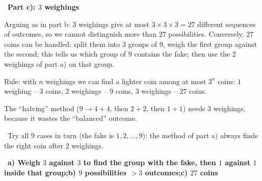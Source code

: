 \documentclass[11pt]{article}
\providecommand{\AnsWord}{Đáp số}
\newcommand{\ans}[1]{\par\smallskip{\bfseries\color{tmGreen!88!black}\AnsWord:}\ {\bfseries\color{AnsRed}#1}\par}
\newcommand{\step}[2]{\par\smallskip\noindent{\bfseries\color{tmBlue!85!black}\StepWord~#1.}\ {\bfseries #2}\par\nopagebreak}
\newcommand{\verify}[1]{\par\smallskip\noindent{\bfseries\color{tmGreen!80!black}\faCheckCircle\ \CheckWord}\ #1\par}
\def\AnsWord{Answer}
\def\StepWord{Step}
\def\CheckWord{Check:}
\begin{document}
{\step{4}{Part c): $3$ weighings}
Arguing as in part b: $3$ weighings give at most $3\times 3\times 3 = 27$ different sequences of outcomes, so we cannot distinguish more
than $27$ possibilities. Conversely, $27$ coins can be handled: split them into $3$ groups of $9$, weigh the first group against the
second; this tells us which group of $9$ contains the fake; then use the $2$ weighings of part a) on that group.
\begin{tipbox}Rule: with $n$ weighings we can find a lighter coin among at most $3^n$ coins: $1$ weighing -- $3$ coins, $2$ weighings --
$9$ coins, $3$ weighings -- $27$ coins.\end{tipbox}
\begin{warnbox}The ``halving'' method ($9 \to 4 + 4$, then $2 + 2$, then $1 + 1$) needs $3$ weighings, because it wastes the
``balanced'' outcome.\end{warnbox}
\verify{Try all $9$ cases in turn (the fake is $1, 2, \dots, 9$): the method of part a) always finds the right coin after $2$ weighings.}
\ans{a) Weigh $3$ against $3$ to find the group with the fake, then $1$ against $1$ inside that group;\quad b) $9$ possibilities $> 3$
outcomes;\quad c) $27$ coins}
}
\end{document}
